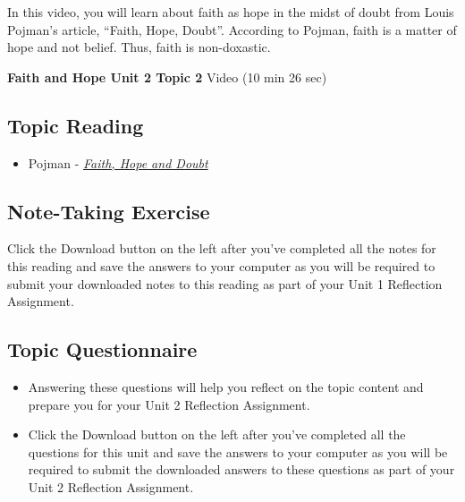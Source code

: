 \documentclass[
]{book}
\providecommand{\tightlist}{%
  \setlength{\itemsep}{0pt}\setlength{\parskip}{0pt}}
\begin{document}
In this video, you will learn about faith as hope in the midst of doubt from Louis Pojman's article, ``Faith, Hope, Doubt''. According to Pojman, faith is a matter of hope and not belief. Thus, faith is non-doxastic.

\textbf{Faith and Hope Unit 2 Topic 2} Video (10 min 26 sec)

\hypertarget{topic-reading-5}{%
\subsection*{Topic Reading}\label{topic-reading-5}}

\begin{itemize}
\tightlist
\item
  Pojman - \href{assets/u2/PHIL-100-Pojman-Faith-Hope-and-Doubt.pdf}{\emph{Faith, Hope and Doubt}}
\end{itemize}

\hypertarget{note-taking-exercise-5}{%
\subsection*{Note-Taking Exercise}\label{note-taking-exercise-5}}

\begin{reflect}
Click the Download button on the left after you've completed all the notes for this reading and save the answers to your computer as you will be required to submit your downloaded notes to this reading as part of your Unit 1 Reflection Assignment.
\end{reflect}

\hypertarget{topic-questionnaire-5}{%
\subsection*{Topic Questionnaire}\label{topic-questionnaire-5}}

\begin{reflect}
\begin{itemize}
\tightlist
\item
  Answering these questions will help you reflect on the topic content and prepare you for your Unit 2 Reflection Assignment.
\item
  Click the Download button on the left after you've completed all the questions for this unit and save the answers to your computer as you will be required to submit the downloaded answers to these questions as part of your Unit 2 Reflection Assignment.
\end{itemize}
\end{reflect}
\end{document}
